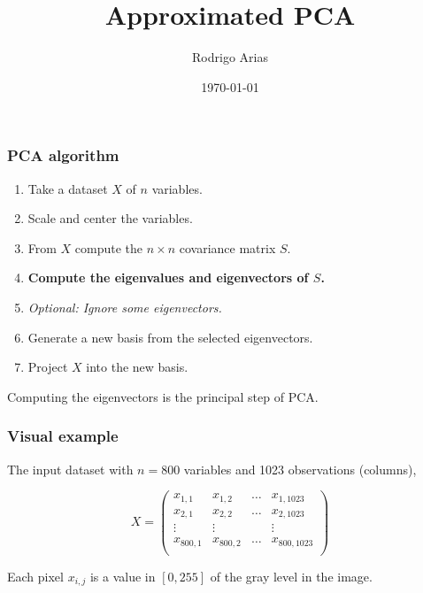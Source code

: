 \documentclass[serif, 12pt]{beamer}
\title{Approximated PCA}
\author{Rodrigo Arias} %
\date{\today} %
\newcommand*\mat[1]{ \begin{pmatrix} #1 \end{pmatrix}}
\begin{document}
\begin{frame}
	\titlepage
\end{frame}


\begin{frame}

\frametitle{PCA algorithm}

\begin{enumerate}
\item Take a dataset $X$ of $n$ variables.
\item Scale and center the variables.
\item From $X$ compute the $n\times n$ covariance matrix $S$.
\item \textbf{Compute the eigenvalues and eigenvectors of $S$.}
\item \textit{Optional: Ignore some eigenvectors.}
\item Generate a new basis from the selected eigenvectors.
\item Project $X$ into the new basis.
\end{enumerate}

\pause

Computing the eigenvectors is the principal step of PCA.

\end{frame}


\begin{frame}

\frametitle{Visual example}

The input dataset with $n=800$ variables and 1023 observations (columns),

$$ X=
	\mat{
		x_{1,1} & x_{1,2} 	& \dots & x_{1,1023}  \\
		x_{2,1} & x_{2,2}  	& \dots & x_{2,1023}  \\
		\vdots  & \vdots  	&       & \vdots      \\
		x_{800,1} & x_{800,2} & \dots & x_{800,1023} \\
	}
$$

Each pixel $x_{i,j}$ is a value in $[0, 255]$ of the gray level in the image.  

\end{frame}

\end{document}
